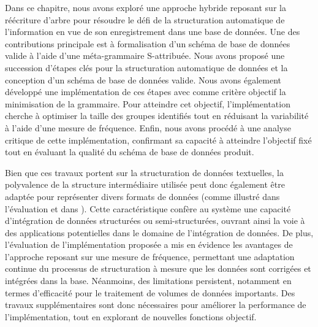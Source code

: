 Dans ce chapitre, nous avons exploré une approche hybride reposant sur la réécriture d'arbre pour résoudre le défi de la structuration automatique de l'information en vue de son enregistrement dans une base de données.
Une des contributions principale est à formalisation d'un schéma de base de données valide à l'aide d'une méta-grammaire S-attribuée.
Nous avons proposé une succession d'étapes clés pour la structuration automatique de données et la conception d'un schéma de base de données valide.
Nous avons également développé une implémentation de ces étapes avec comme critère objectif la minimisation de la grammaire.
Pour atteindre cet objectif, l'implémentation cherche à optimiser la taille des groupes identifiés tout en réduisant la variabilité à l'aide d'une mesure de fréquence.
Enfin, nous avons procédé à une analyse critique de cette implémentation, confirmant sa capacité à atteindre l'objectif fixé tout en évaluant la qualité du schéma de base de données produit.

Bien que ces travaux portent sur la structuration de données textuelles, la polyvalence de la structure intermédiaire utilisée peut donc également être adaptée pour représenter divers formats de données (comme illustré dans l'évaluation et dans \cite{barretAbstraGenericAbstractions2022}).
Cette caractéristique confère au système une capacité d'intégration de données structurées ou semi-structurées, ouvrant ainsi la voie à des applications potentielles dans le domaine de l'intégration de données.
De plus, l'évaluation de l'implémentation proposée a mis en évidence les avantages de l'approche reposant sur une mesure de fréquence, permettant une adaptation continue du processus de structuration à mesure que les données sont corrigées et intégrées dans la base.
Néanmoins, des limitations persistent, notamment en termes d'efficacité pour le traitement de volumes de données importants.
Des travaux supplémentaires sont donc nécessaires pour améliorer la performance de l'implémentation, tout en explorant de nouvelles fonctions objectif.

